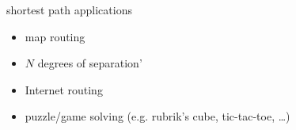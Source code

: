 \begin{frame}{shortest path applications}
\begin{itemize}
\item map routing
\item $N$ degrees of separation'
\item Internet routing
\item puzzle/game solving (e.g. rubrik's cube, tic-tac-toe, \ldots)
\end{itemize}
\end{frame}
